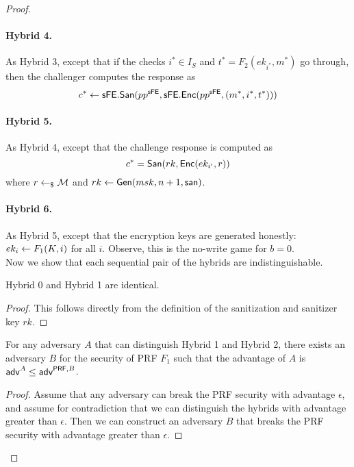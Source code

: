 \documentclass{llncs}
\begin{document}
\begin{proof}
\paragraph{Hybrid 4.} As Hybrid 3, except that if the checks $i^* \in I_S$ and $t^* = F_{2}(ek_{i^*},m^*)$ go through, then the challenger computes the response as
$$ c^* \leftarrow \mathsf{sFE}.\mathsf{San}(pp^{\mathsf{sFE}},\mathsf{sFE}.\mathsf{Enc}(pp^{\mathsf{sFE}}, (m^*,i^*,t^*)))$$

\paragraph{Hybrid 5.} As Hybrid 4, except that the challenge response is computed as
$$ c^* = \mathsf{San}(rk,\mathsf{Enc}(ek_{i'},r))$$
where $r \leftarrow_\$ \mathcal{M}$ and $rk \leftarrow \mathsf{Gen}(msk,n+1,\mathsf{san})$.

\paragraph{Hybrid 6.} As Hybrid 5, except that the encryption keys are generated honestly: $ek_i \leftarrow F_1(K,i)$ for all $i$. Observe, this is the no-write game for $b=0$. \\



Now we show that each sequential pair of the hybrids are indistinguishable.

\begin{claim}
Hybrid 0 and Hybrid 1 are identical.
\end{claim}

\begin{proof}
This follows directly from the definition of the sanitization and sanitizer key $rk$.
\end{proof}

\begin{claim} \label{claim:ACE_nowrite_PRF_1}
For any adversary $A$ that can distinguish Hybrid 1 and Hybrid 2, there exists an adversary $B$ for the security of PRF $F_1$ such that the advantage of $A$ is 
$ \mathsf{adv}^{A} \leq \mathsf{adv}^{\mathsf{PRF},B}$.
\end{claim}

\begin{proof}
Assume that any adversary can break the PRF security with advantage $\epsilon$, and assume for contradiction that we can distinguish the hybrids with advantage greater than $\epsilon$. Then we can construct an adversary $B$ that breaks the PRF security with advantage greater than $\epsilon$.


\end{proof}
\end{proof}
\end{document}
